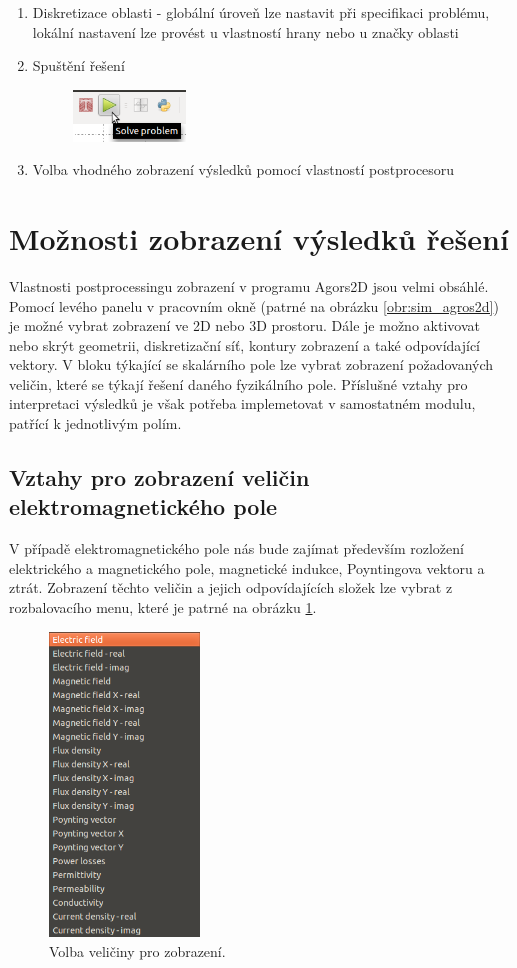 \begin{enumerate}
\item Diskretizace oblasti - globální úroveň lze nastavit při specifikaci problému, lokální nastavení lze provést u vlastností hrany nebo u značky oblasti 
\item Spuštění řešení
\begin{figure}[!h]
	\centering
	\includegraphics[width=3cm]{sim_spusteni_reseni.png}
\end{figure}
\item Volba vhodného zobrazení výsledků pomocí vlastností postprocesoru
\end{enumerate}

\section{Možnosti zobrazení výsledků řešení}
Vlastnosti postprocessingu zobrazení v programu Agors2D jsou velmi obsáhlé. Pomocí levého panelu v pracovním okně (patrné na obrázku \ref{obr:sim_agros2d}) je možné vybrat zobrazení ve 2D nebo 3D prostoru. Dále je možno aktivovat nebo skrýt geometrii,  diskretizační síť, kontury zobrazení a také odpovídající vektory. V bloku týkající se skalárního pole lze vybrat zobrazení požadovaných veličin, které se týkají řešení daného fyzikálního pole. Příslušné vztahy pro interpretaci výsledků je však potřeba implemetovat v samostatném modulu, patřící k jednotlivým polím.

\subsection{Vztahy pro zobrazení veličin elektromagnetického pole}
V případě elektromagnetického pole nás bude zajímat především rozložení elektrického a magnetického pole, magnetické indukce, Poyntingova vektoru a ztrát. Zobrazení těchto  veličin a jejich odpovídajících složek lze vybrat z rozbalovacího menu, které je patrné na obrázku \ref{obr:sim_zobrazeni}.
\begin{figure}[!h]
	\centering
	\includegraphics[width=4cm]{sim_zobrazeni.png}
	\caption{Volba veličiny pro zobrazení.}
	\label{obr:sim_zobrazeni}
\end{figure}
 
